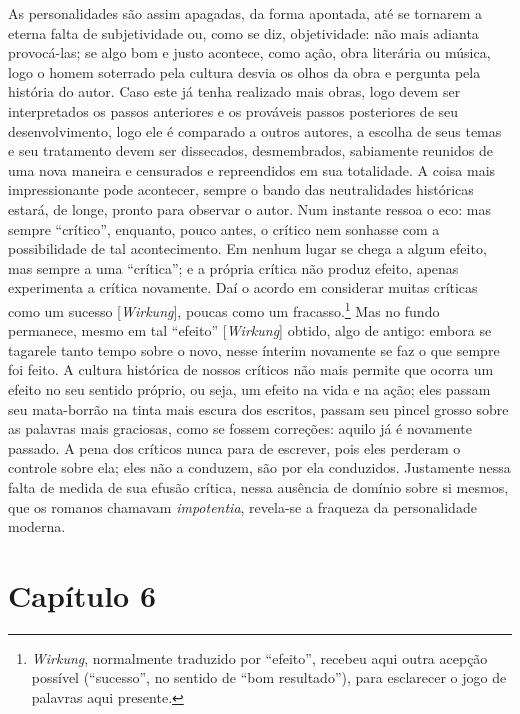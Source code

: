As personalidades são assim apagadas, da forma apontada, até se tornarem
a eterna falta de subjetividade ou, como se diz, objetividade: não mais
adianta provocá-las; se algo bom e justo acontece, como ação, obra
literária ou música, logo o homem soterrado pela cultura desvia os olhos
da obra e pergunta pela história do autor. Caso este já tenha realizado
mais obras, logo devem ser interpretados os passos anteriores e os
prováveis passos posteriores de seu desenvolvimento, logo ele é
comparado a outros autores, a escolha de seus temas e seu tratamento
devem ser dissecados, desmembrados, sabiamente reunidos de uma nova
maneira e censurados e repreendidos em sua totalidade. A coisa mais
impressionante pode acontecer, sempre o bando das neutralidades
históricas estará, de longe, pronto para observar o autor. Num instante
ressoa o eco: mas sempre ``crítico'', enquanto, pouco antes, o crítico
nem sonhasse com a possibilidade de tal acontecimento. Em nenhum lugar
se chega a algum efeito, mas sempre a uma ``crítica''; e a própria
crítica não produz efeito, apenas experimenta a crítica novamente. Daí o
acordo em considerar muitas críticas como um sucesso
{[}\emph{Wirkung}{]}, poucas como um fracasso.\footnote{\emph{Wirkung},
  normalmente traduzido por ``efeito'', recebeu aqui outra acepção
  possível (``sucesso'', no sentido de ``bom resultado''), para
  esclarecer o jogo de palavras aqui presente.} Mas no fundo permanece,
mesmo em tal ``efeito'' {[}\emph{Wirkung}{]} obtido, algo de antigo:
embora se tagarele tanto tempo sobre o novo, nesse ínterim novamente se
faz o que sempre foi feito. A cultura histórica de nossos críticos não
mais permite que ocorra um efeito no seu sentido próprio, ou seja, um
efeito na vida e na ação; eles passam seu mata-borrão na tinta mais
escura dos escritos, passam seu pincel grosso sobre as palavras mais
graciosas, como se fossem correções: aquilo já é novamente passado. A
pena dos críticos nunca para de escrever, pois eles perderam o controle
sobre ela; eles não a conduzem, são por ela conduzidos. Justamente nessa
falta de medida de sua efusão crítica, nessa ausência de domínio sobre
si mesmos, que os romanos chamavam \emph{impotentia}, revela-se a
fraqueza da personalidade moderna.

\chapter{Capítulo 6}\label{capuxedtulo-6}

